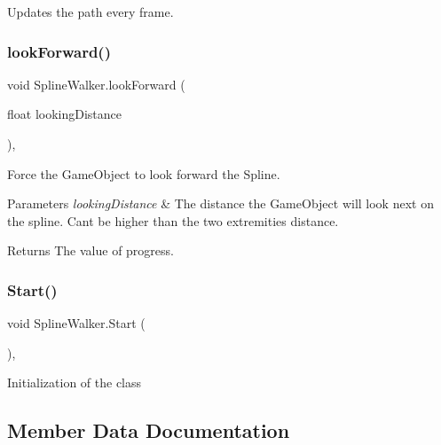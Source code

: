 Updates the path every frame. 

\mbox{\label{classSplineWalker_af1b6b1a3ede935316f1b5f686a2a9989}} 
\subsubsection{\texorpdfstring{look\+Forward()}{lookForward()}}
{\footnotesize\ttfamily void Spline\+Walker.\+look\+Forward (\begin{DoxyParamCaption}\item[{float}]{looking\+Distance }\end{DoxyParamCaption})\hspace{0.3cm}{\ttfamily [inline]}, {\ttfamily [private]}}



Force the Game\+Object to look forward the Spline. 


\begin{DoxyParams}{Parameters}
{\em looking\+Distance} & The distance the Game\+Object will look next on the spline. Can\textquotesingle{}t be higher than the two extremities distance.\\
\hline
\end{DoxyParams}
\begin{DoxyReturn}{Returns}
The value of progress.
\end{DoxyReturn}
\mbox{\label{classSplineWalker_a7302455633490f68b15aad02b8fa54ca}} 
\subsubsection{\texorpdfstring{Start()}{Start()}}
{\footnotesize\ttfamily void Spline\+Walker.\+Start (\begin{DoxyParamCaption}{ }\end{DoxyParamCaption})\hspace{0.3cm}{\ttfamily [inline]}, {\ttfamily [private]}}



Initialization of the class 



\subsection{Member Data Documentation}
\mbox{\label{classSplineWalker_a82080d499233b63d2cbde7274e2036b6}} 
